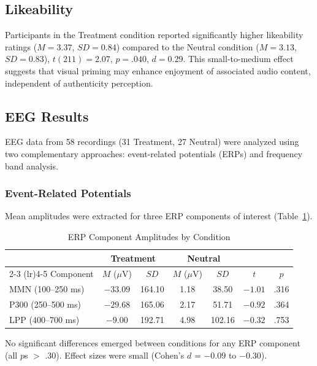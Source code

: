 \documentclass[12pt, a4paper]{article}
\begin{document}
\subsection{Likeability}

Participants in the Treatment condition reported significantly higher likeability ratings ($M = 3.37$, $SD = 0.84$) compared to the Neutral condition ($M = 3.13$, $SD = 0.83$), $t(211) = 2.07$, $p = .040$, $d = 0.29$. This small-to-medium effect suggests that visual priming may enhance enjoyment of associated audio content, independent of authenticity perception.

\subsection{EEG Results}

EEG data from 58 recordings (31 Treatment, 27 Neutral) were analyzed using two complementary approaches: event-related potentials (ERPs) and frequency band analysis.

\subsubsection{Event-Related Potentials}

Mean amplitudes were extracted for three ERP components of interest (Table~\ref{tab:erp}).

\begin{table}[H]
\centering
\caption{ERP Component Amplitudes by Condition}
\begin{tabular}{lcccccc}
\toprule
& \multicolumn{2}{c}{Treatment} & \multicolumn{2}{c}{Neutral} & & \\
\cmidrule(lr){2-3} \cmidrule(lr){4-5}
Component & $M$ ($\mu$V) & $SD$ & $M$ ($\mu$V) & $SD$ & $t$ & $p$ \\
\midrule
MMN (100--250 ms) & $-33.09$ & 164.10 & 1.18 & 38.50 & $-1.01$ & .316 \\
P300 (250--500 ms) & $-29.68$ & 165.06 & 2.17 & 51.71 & $-0.92$ & .364 \\
LPP (400--700 ms) & $-9.00$ & 192.71 & 4.98 & 102.16 & $-0.32$ & .753 \\
\bottomrule
\end{tabular}
\label{tab:erp}
\end{table}

No significant differences emerged between conditions for any ERP component (all $p$s $>$ .30). Effect sizes were small (Cohen's $d$ = $-0.09$ to $-0.30$).
\end{document}
